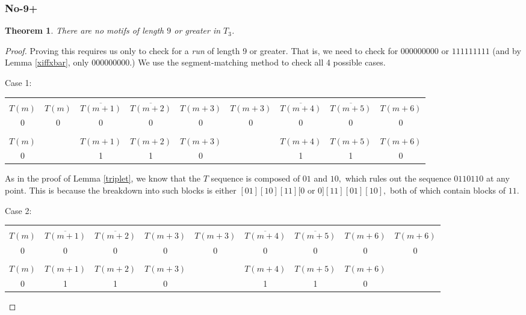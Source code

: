 \documentclass{article}
\newtheorem{theorem}{Theorem}[section]
\begin{document}
\subsubsection{No-9+}

\begin{theorem}
\label{no9}
There are no motifs of length $9$ or greater in $T_3$.
\end{theorem}

\begin{proof}
Proving this requires us only to check for a \emph{run} of length 9 or greater. That is, we need to check for $000000000$ or $111111111$ (and by Lemma \ref{xiffxbar}, only $000000000.$) We use the segment-matching method to check all 4 possible cases.

Case 1:

\begin{center}
\begin{tabular}{ |c|c|c|c|c|c|c|c|c| } 
 \hline
&&&&&&&&\\
$T(m)$ & $T(m)$ & $\overline{T(m+1)}$ & $\overline{T(m+2)}$ & $T(m+3)$ & $T(m+3)$ & $\overline{T(m+4)}$ & $\overline{T(m+5)}$ & $T(m+6)$ \\ 
0 & 0 & 0 & 0 & 0 & 0 & 0 & 0 & 0 \\
\hline
&&&&&&&&\\
$T(m)$ & & $T(m+1)$ & $T(m+2)$ & $T(m+3)$ & & $T(m+4)$ & $T(m+5)$ & $T(m+6)$ \\
0 & & 1 & 1 & 0 & & 1 & 1 & 0 \\
 \hline
\end{tabular}
\end{center}

As in the proof of Lemma \ref{triplet}, we know that the $T$ sequence is composed of $01$ and $10,$ which rules out the sequence $0110110$ at any point. This is because the breakdown into such blocks is either $[01][10][11][0$ or $0][11][01][10],$ both of which contain blocks of $11.$

Case 2:

\begin{center}
\begin{tabular}{ |c|c|c|c|c|c|c|c|c| } 
 \hline
&&&&&&&&\\
$T(m)$ & $\overline{T(m+1)}$ & $\overline{T(m+2)}$ & $T(m+3)$ & $T(m+3)$ & $\overline{T(m+4)}$ & $\overline{T(m+5)}$ & $T(m+6)$ & $T(m+6)$ \\ 
0 & 0 & 0 & 0 & 0 & 0 & 0 & 0 & 0 \\
\hline
&&&&&&&&\\
$T(m)$ & $T(m+1)$ & $T(m+2)$ & $T(m+3)$ & & $T(m+4)$ & $T(m+5)$ & $T(m+6)$ & \\
0 & 1 & 1 & 0 & & 1 & 1 & 0 & \\
 \hline
\end{tabular}
\end{center}


\end{proof}
\end{document}
